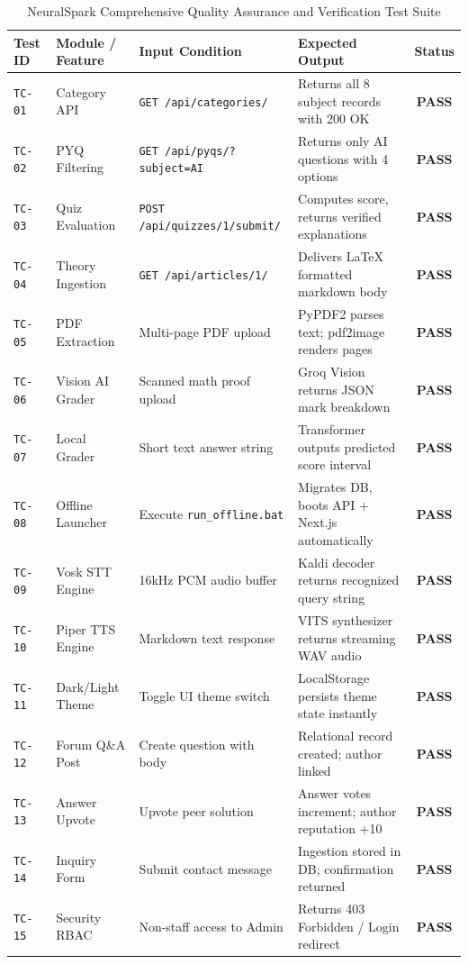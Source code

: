\begin{table}[H]
\centering
\caption{NeuralSpark Comprehensive Quality Assurance and Verification Test Suite}
\label{tab:qa_test_suite}
\small
\begin{tabularx}{\textwidth}{p{1.2cm} p{3.2cm} p{4.0cm} p{3.8cm} c}
\toprule
\textbf{Test ID} & \textbf{Module / Feature} & \textbf{Input Condition} & \textbf{Expected Output} & \textbf{Status} \\
\midrule
\texttt{TC-01} & Category API & \texttt{GET /api/categories/} & Returns all 8 subject records with 200 OK & \textbf{PASS} \\
\texttt{TC-02} & PYQ Filtering & \texttt{GET /api/pyqs/?subject=AI} & Returns only AI questions with 4 options & \textbf{PASS} \\
\texttt{TC-03} & Quiz Evaluation & \texttt{POST /api/quizzes/1/submit/} & Computes score, returns verified explanations & \textbf{PASS} \\
\texttt{TC-04} & Theory Ingestion & \texttt{GET /api/articles/1/} & Delivers LaTeX formatted markdown body & \textbf{PASS} \\
\texttt{TC-05} & PDF Extraction & Multi-page PDF upload & PyPDF2 parses text; pdf2image renders pages & \textbf{PASS} \\
\texttt{TC-06} & Vision AI Grader & Scanned math proof upload & Groq Vision returns JSON mark breakdown & \textbf{PASS} \\
\texttt{TC-07} & Local Grader & Short text answer string & Transformer outputs predicted score interval & \textbf{PASS} \\
\texttt{TC-08} & Offline Launcher & Execute \texttt{run\_offline.bat} & Migrates DB, boots API + Next.js automatically & \textbf{PASS} \\
\texttt{TC-09} & Vosk STT Engine & 16kHz PCM audio buffer & Kaldi decoder returns recognized query string & \textbf{PASS} \\
\texttt{TC-10} & Piper TTS Engine & Markdown text response & VITS synthesizer returns streaming WAV audio & \textbf{PASS} \\
\texttt{TC-11} & Dark/Light Theme & Toggle UI theme switch & LocalStorage persists theme state instantly & \textbf{PASS} \\
\texttt{TC-12} & Forum Q\&A Post & Create question with body & Relational record created; author linked & \textbf{PASS} \\
\texttt{TC-13} & Answer Upvote & Upvote peer solution & Answer votes increment; author reputation +10 & \textbf{PASS} \\
\texttt{TC-14} & Inquiry Form & Submit contact message & Ingestion stored in DB; confirmation returned & \textbf{PASS} \\
\texttt{TC-15} & Security RBAC & Non-staff access to Admin & Returns 403 Forbidden / Login redirect & \textbf{PASS} \\
\bottomrule
\end{tabularx}
\end{table}

